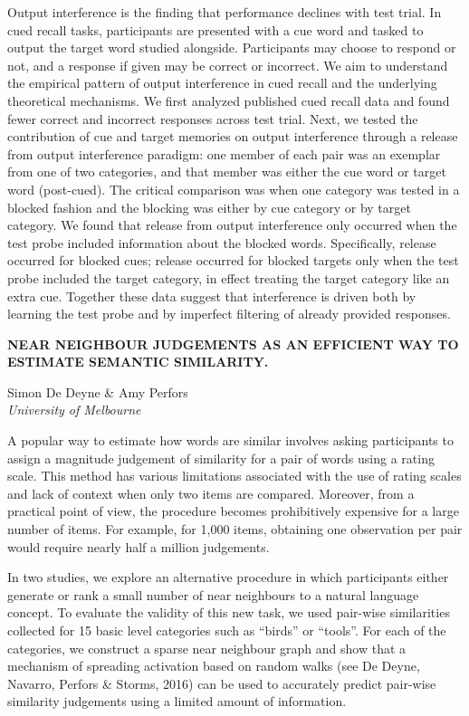 \documentclass[]{article}
\begin{document}
Output interference is the finding that performance declines with test
trial. In cued recall tasks, participants are presented with a cue word
and tasked to output the target word studied alongside. Participants may
choose to respond or not, and a response if given may be correct or
incorrect. We aim to understand the empirical pattern of output
interference in cued recall and the underlying theoretical mechanisms.
We first analyzed published cued recall data and found fewer correct and
incorrect responses across test trial. Next, we tested the contribution
of cue and target memories on output interference through a release from
output interference paradigm: one member of each pair was an exemplar
from one of two categories, and that member was either the cue word or
target word (post-cued). The critical comparison was when one category
was tested in a blocked fashion and the blocking was either by cue
category or by target category. We found that release from output
interference only occurred when the test probe included information
about the blocked words. Specifically, release occurred for blocked
cues; release occurred for blocked targets only when the test probe
included the target category, in effect treating the target category
like an extra cue. Together these data suggest that interference is
driven both by learning the test probe and by imperfect filtering of
already provided responses.\\
\pagebreak  

\textbf{NEAR NEIGHBOUR JUDGEMENTS AS AN EFFICIENT WAY TO ESTIMATE
SEMANTIC SIMILARITY.}

Simon De Deyne \& Amy Perfors\\
\emph{University of Melbourne}

A popular way to estimate how words are similar involves asking
participants to assign a magnitude judgement of similarity for a pair of
words using a rating scale. This method has various limitations
associated with the use of rating scales and lack of context when only
two items are compared. Moreover, from a practical point of view, the
procedure becomes prohibitively expensive for a large number of items.
For example, for 1,000 items, obtaining one observation per pair would
require nearly half a million judgements.

In two studies, we explore an alternative procedure in which
participants either generate or rank a small number of near neighbours
to a natural language concept. To evaluate the validity of this new
task, we used pair-wise similarities collected for 15 basic level
categories such as ``birds'' or ``tools''. For each of the categories,
we construct a sparse near neighbour graph and show that a mechanism of
spreading activation based on random walks (see De Deyne, Navarro,
Perfors \& Storms, 2016) can be used to accurately predict pair-wise
similarity judgements using a limited amount of information.
\end{document}
